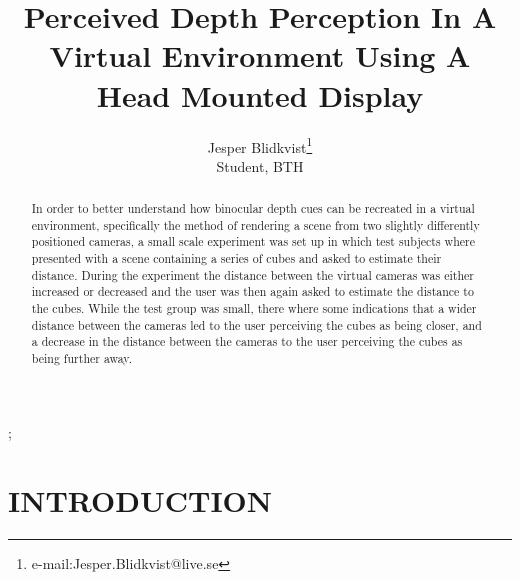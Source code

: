 \documentclass[tog]{acmsiggraph}
\title{Perceived Depth Perception In A Virtual Environment Using A Head Mounted Display}
\author{Jesper Blidkvist\thanks{e-mail:Jesper.Blidkvist@live.se}\\Student, BTH}
\begin{document}


\maketitle

\begin{abstract}
In order to better understand how binocular depth cues can be recreated in a virtual environment, specifically the method of rendering a scene from two slightly differently positioned cameras, a small scale experiment was set up in which test subjects where presented with a scene containing a series of cubes and asked to estimate their distance. During the experiment the distance between the virtual cameras was either increased or decreased and the user was then again asked to estimate the distance to the cubes. While the test group was small, there where some indications that a wider distance between the cameras led to the user perceiving the cubes as being closer, and a decrease in the distance between the cameras to the user perceiving the cubes as being further away.



\end{abstract}

\begin{CRcatlist}
  ;
\end{CRcatlist}

\keywordlist


\copyrightspace

\section{INTRODUCTION}
\end{document}
